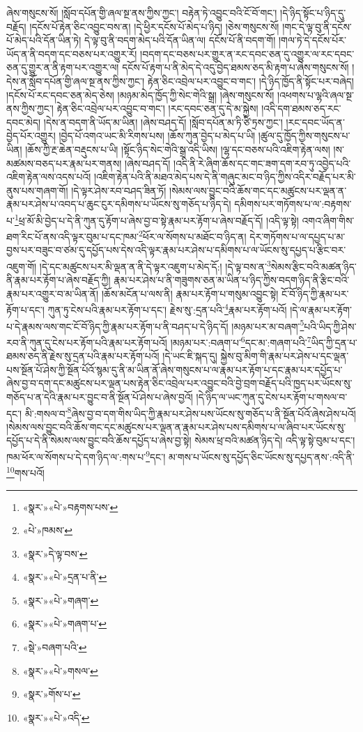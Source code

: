 ཞེས་གསུངས་སོ། །སློབ་དཔོན་གྱི་ཞལ་སྔ་ནས་ཀྱིས་ཀྱང་། བརྟེན་ཏེ་འབྱུང་བའི་ངོ་བོ་གང་། །དེ་ཉིད་སྟོང་པ་ཉིད་དུ་བརྗོད། །དངོས་པོ་རྟེན་ཅིང་འབྱུང་བས་ན། །དེ་ཕྱིར་དངོས་པོ་མེད་པ་ཉིད། །ཅེས་གསུངས་སོ། །གང་དེ་ལྟ་བུ་ནི་དངོས་པོ་མེད་པའི་དོན་ཡིན་ཏེ། དེ་ལྟ་བུ་ནི་བདག་མེད་པའི་དོན་ཡིན་ལ། དངོས་པོ་ནི་བདག་གོ། །གལ་ཏེ་དེ་དངོས་པོར་ཡོད་ན་ནི་བདག་དང་བཅས་པར་འགྱུར་རོ། །བདག་དང་བཅས་པར་གྱུར་ན་རང་དབང་ཅན་དུ་འགྱུར་ལ་རང་དབང་ཅན་དུ་གྱུར་ན་ནི་རྟག་པར་འགྱུར་ལ། དངོས་པོ་རྟག་པ་ནི་མེད་དེ་འདུ་བྱེད་ཐམས་ཅད་མི་རྟག་པ་ཞེས་གསུངས་སོ། །དེས་ན་སློབ་དཔོན་གྱི་ཞལ་སྔ་ནས་ཀྱིས་ཀྱང་། རྟེན་ཅིང་འབྲེལ་པར་འབྱུང་བ་གང་། །དེ་ཉིད་ཁྱོད་ནི་སྟོང་པར་བཞེད། །དངོས་པོ་རང་དབང་ཅན་མེད་ཅེས། །མཉམ་མེད་ཁྱོད་ཀྱི་སེང་གེའི་སྒྲ། །ཞེས་གསུངས་སོ། །འཕགས་པ་ལྷའི་ཞལ་སྔ་ནས་ཀྱིས་ཀྱང་། རྟེན་ཅིང་འབྲེལ་པར་འབྱུང་བ་གང་། །རང་དབང་ཅན་དུ་དེ་མ་སྐྱེས། །འདི་དག་ཐམས་ཅད་རང་དབང་མེད། །དེས་ན་བདག་ནི་ཡོད་མ་ཡིན། །ཞེས་བཤད་དོ། །སློབ་དཔོན་མ་ཏི་ཙི་ཏྲས་ཀྱང་། །རང་དབང་ཡོད་ན་བྱེད་པོར་འགྱུར། །བྱེད་པོ་འགའ་ཡང་མི་རིགས་པས། །ཆོས་ཀུན་བྱེད་པ་མེད་པ་ཡི། །ཚུལ་དུ་ཁྱོད་ཀྱིས་གསུངས་པ་ཡིན། །ཆོས་ཀྱི་རྔ་ཆེན་བརྡུངས་པ་ཡི། །སྟོང་ཉིད་སེང་གེའི་སྒྲ་འདི་ཡིས། །ལྷ་དང་བཅས་པའི་འཇིག་རྟེན་ལས། །ས་མཚམས་བཅད་པར་རྣམ་པར་གནས། །ཞེས་བཤད་དོ། །འདི་ནི་རེ་ཞིག་ཆོས་དང་གང་ཟག་དག་རབ་ཏུ་འབྱེད་པའི་འཇིག་རྟེན་ལས་འདས་པའོ། །འཇིག་རྟེན་པའི་ནི་མཐའ་མེད་པས་དེ་ནི་གཞུང་མང་བ་ཉིད་ཀྱིས་འདིར་བརྗོད་པར་མི་ནུས་པས་གཞག་གོ། །དེ་ལྟར་ཤེས་རབ་བཤད་ཟིན་ཏོ། །སེམས་ལས་བྱུང་བའི་ཆོས་གང་དང་མཚུངས་པར་ལྡན་ན་རྣམ་པར་ཤེས་པ་འབད་པ་ཆུང་ངུར་དམིགས་པ་ཡོངས་སུ་གཅོད་པ་ཉིད་དེ། དམིགས་པར་གཏོགས་པ་ལ་:བརྟགས་པ་\footnote{«སྣར་»«པེ་»བརྟགས་པས་}ཕྲ་མོ་མི་བྱེད་པ་དེ་ནི་ཀུན་དུ་རྟོག་པ་ཞེས་བྱ་བ་སྟེ་རྣམ་པར་རྟོག་པ་ཞེས་བརྗོད་དོ། །འདི་ལྟ་སྟེ། འགའ་ཞིག་གིས་ཐག་རིང་པོ་ནས་འདི་ལྟར་བུམ་པ་དང་ཁམ་\footnote{«པེ་»ཁམས་}ཕོར་ལ་སོགས་པ་མཐོང་བ་ཉིད་ན། དེར་གཏོགས་པ་ལ་དཔྱད་པ་མ་བྱས་པར་བཟུང་བ་ཙམ་དུ་དཔྱོད་པས་དེས་འདི་ལྟར་རྣམ་པར་ཤེས་པ་དམིགས་པ་ལ་ཡོངས་སུ་དཔྱད་པ་རྩིང་བར་འཇུག་གོ། །དེ་དང་མཚུངས་པར་མི་ལྡན་ན་ནི་དེ་ལྟར་འཇུག་པ་མེད་དོ:། །དེ་ལྟ་བས་ན་\footnote{«སྣར་»དེ་ལྟ་བས་}སེམས་རྩིང་བའི་མཚན་ཉིད་ནི་རྣམ་པར་རྟོག་པ་ཞེས་བརྗོད་ཀྱི། རྣམ་པར་ཤེས་པ་ནི་གཟུགས་ཅན་མ་ཡིན་པ་ཉིད་ཀྱིས་བདག་ཉིད་ནི་རྩིང་བའི་རྣམ་པར་འགྱུར་བ་མ་ཡིན་ནོ། །ཆོས་མངོན་པ་ལས་ནི། རྣམ་པར་རྟོག་པ་གསུམ་འབྱུང་སྟེ། ངོ་བོ་ཉིད་ཀྱི་རྣམ་པར་རྟོག་པ་དང་། ཀུན་ཏུ་ངེས་པའི་རྣམ་པར་རྟོག་པ་དང་། རྗེས་སུ་:དྲན་པའི་\footnote{«སྣར་»«པེ་»དྲན་པ་ནི་}རྣམ་པར་རྟོག་པའོ། །དེ་ལ་རྣམ་པར་རྟོག་པ་དེ་རྣམས་ལས་གང་ངོ་བོ་ཉིད་ཀྱི་རྣམ་པར་རྟོག་པ་ནི་བཤད་པ་དེ་ཉིད་དོ། །མཉམ་པར་མ་བཞག་\footnote{«སྣར་»«པེ་»གཞག་}པའི་ཡིད་ཀྱི་ཤེས་རབ་ནི་ཀུན་དུ་ངེས་པར་རྟོག་པའི་རྣམ་པར་རྟོག་པའོ། །མཉམ་པར་:བཞག་པ་\footnote{«སྣར་»«པེ་»གཞག་པ་}དང་མ་:གཞག་པའི་\footnote{«སྡེ་»བཞག་པའི་}ཡིད་ཀྱི་དྲན་པ་ཐམས་ཅད་ནི་རྗེས་སུ་དྲན་པའི་རྣམ་པར་རྟོག་པའོ། །དེ་ཡང་ཇི་སྐད་དུ། སྐྱེས་བུ་མིག་གི་རྣམ་པར་ཤེས་པ་དང་ལྡན་པས་སྔོན་པོ་ཤེས་ཀྱི་སྔོན་པོའོ་སྙམ་དུ་ནི་མ་ཡིན་ནོ་ཞེས་གསུངས་པ་ལ་རྣམ་པར་རྟོག་པ་དང་རྣམ་པར་དཔྱོད་པ་ཞེས་བྱ་བ་དག་དང་མཚུངས་པར་ལྡན་པས་རྟེན་ཅིང་འབྲེལ་པར་འབྱུང་བའི་བྱེ་བྲག་བརྗོད་པའི་ཁྱད་པར་ཡོངས་སུ་གཅོད་པ་ན་དེའི་རྣམ་པར་བྱུང་བ་ནི་སྔོན་པོ་ཤེས་པ་ཞེས་བྱའོ། །དེ་ཉིད་ལ་ཡང་ཀུན་དུ་ངེས་པར་རྟོག་པ་གསལ་བ་དང་། མི་:གསལ་བ་\footnote{«སྣར་»«པེ་»གསལ་}ཞེས་བྱ་བ་དག་གིས་ཡིད་ཀྱི་རྣམ་པར་ཤེས་པས་ཡོངས་སུ་གཅོད་པ་ནི་སྔོན་པོའོ་ཞེས་ཤེས་པའོ། །སེམས་ལས་བྱུང་བའི་ཆོས་གང་དང་མཚུངས་པར་ལྡན་ན་རྣམ་པར་ཤེས་པས་དམིགས་པ་ལ་ཞིབ་པར་ཡོངས་སུ་དཔྱོད་པ་དེ་ནི་སེམས་ལས་བྱུང་བའི་ཆོས་དཔྱོད་པ་ཞེས་བྱ་སྟེ། སེམས་ཕྲ་བའི་མཚན་ཉིད་དེ། འདི་ལྟ་སྟེ་བུམ་པ་དང་། ཁམ་ཕོར་ལ་སོགས་པ་དེ་དག་ཉིད་ལ་:གས་པ་\footnote{«སྣར་»གོས་པ་}དང་། མ་གས་པ་ཡོངས་སུ་དཔྱོད་ཅིང་ཡོངས་སུ་དཔྱད་ནས་:འདི་ནི་\footnote{«སྣར་»«པེ་»འདི་}གས་པའོ། 